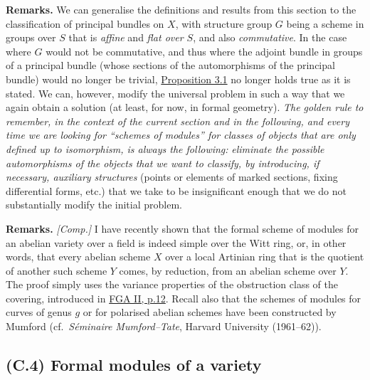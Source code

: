 \documentclass{article}
\newenvironment{rmenv}[1]
  {\phantomsection\par\smallskip\noindent\textbf{#1.}\rmfamily}
  {\par\smallskip}
\newcommand{\oldpage}[1]{\marginpar{\footnotesize$\Big\vert$ \textit{p.~#1}}}
\theoremstyle{definition}
\theoremstyle{definition}
\theoremstyle{definition}
\theoremstyle{definition}
\theoremstyle{remark}
\begin{document}
\begin{rmenv}{Remarks}
We can generalise the definitions and results from this section to the classification of principal bundles on \(X\), with structure group \(G\) being a scheme in groups over \(S\) that is \emph{affine} and \emph{flat over \(S\)}, and also \emph{commutative}.
In the case where \(G\) would not be commutative, and thus where the adjoint bundle in groups of a principal bundle (whose sections of the automorphisms of the principal bundle) would no longer be trivial, \protect\hyperlink{fga-3-ii-section-C.3-proposition-3.1}{Proposition 3.1} no longer holds true as it is stated.
We can, however, modify the universal problem in such a way that we again obtain a solution (at least, for now, in formal geometry).
\oldpage{195-17}\emph{The golden rule to remember, in the context of the current}
\emph{section and in the following, and every time we are looking for ``schemes of modules'' for classes of objects that are only defined up to isomorphism, is always the following:}
\emph{eliminate the possible automorphisms of the objects that we want to classify, by introducing, if necessary, auxiliary structures} (points or elements of marked sections, fixing differential forms, etc.) that we take to be insignificant enough that we do not substantially modify the initial problem.

\end{rmenv}

\begin{rmenv}{Remarks}
\emph{{[}Comp.{]}}
I have recently shown that the formal scheme of modules for an abelian variety over a field is indeed simple over the Witt ring, or, in other words, that every abelian scheme \(X\) over a local Artinian ring that is the quotient of another such scheme \(Y\) comes, by reduction, from an abelian scheme over \(Y\).
The proof simply uses the variance properties of the obstruction class of the covering, introduced in \protect\hyperlink{fga-2-section-6}{FGA II, p.12}.
Recall also that the schemes of modules for curves of genus \(g\) or for polarised abelian schemes have been constructed by Mumford (cf.~\emph{Séminaire Mumford--Tate}, Harvard University (1961--62)).

\end{rmenv}

\hypertarget{fga-3-ii-section-C.4}{%
\subsection{(C.4) Formal modules of a variety}\label{fga-3-ii-section-C.4}}
\end{document}
